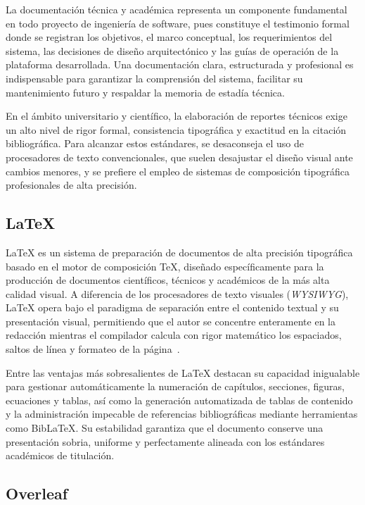 La documentación técnica y académica representa un componente fundamental en todo proyecto de ingeniería de software, pues constituye el testimonio formal donde se registran los objetivos, el marco conceptual, los requerimientos del sistema, las decisiones de diseño arquitectónico y las guías de operación de la plataforma desarrollada. Una documentación clara, estructurada y profesional es indispensable para garantizar la comprensión del sistema, facilitar su mantenimiento futuro y respaldar la memoria de estadía técnica.

En el ámbito universitario y científico, la elaboración de reportes técnicos exige un alto nivel de rigor formal, consistencia tipográfica y exactitud en la citación bibliográfica. Para alcanzar estos estándares, se desaconseja el uso de procesadores de texto convencionales, que suelen desajustar el diseño visual ante cambios menores, y se prefiere el empleo de sistemas de composición tipográfica profesionales de alta precisión.

\subsection{LaTeX}

\LaTeX{} es un sistema de preparación de documentos de alta precisión tipográfica basado en el motor de composición \TeX{}, diseñado específicamente para la producción de documentos científicos, técnicos y académicos de la más alta calidad visual. A diferencia de los procesadores de texto visuales (\textit{WYSIWYG}), \LaTeX{} opera bajo el paradigma de separación entre el contenido textual y su presentación visual, permitiendo que el autor se concentre enteramente en la redacción mientras el compilador calcula con rigor matemático los espaciados, saltos de línea y formateo de la página~\cite{overleaf_latex}.

Entre las ventajas más sobresalientes de \LaTeX{} destacan su capacidad inigualable para gestionar automáticamente la numeración de capítulos, secciones, figuras, ecuaciones y tablas, así como la generación automatizada de tablas de contenido y la administración impecable de referencias bibliográficas mediante herramientas como BibLaTeX. Su estabilidad garantiza que el documento conserve una presentación sobria, uniforme y perfectamente alineada con los estándares académicos de titulación.

\subsection{Overleaf}

